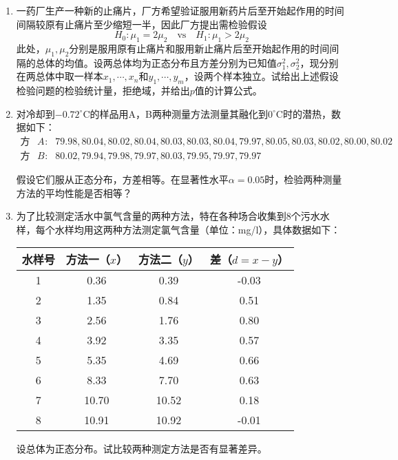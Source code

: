 \begin{enumerate}
\item 一药厂生产一种新的止痛片，厂方希望验证服用新药片后至开始起作用的时间间隔较原有止痛片至少缩短一半，因此厂方提出需检验假设
$$
H_0: \mu_1 = 2\mu_2 \quad \text{vs} \quad H_1: \mu_1 > 2\mu_2
$$
此处，$\mu_1,\mu_2$分别是服用原有止痛片和服用新止痛片后至开始起作用的时间间隔的总体的均值。设两总体均为正态分布且方差分别为已知值$\sigma_1^2,\sigma_2^2$，现分别在两总体中取一样本$x_1,\cdots,x_n$和$y_1,\cdots,y_m$，设两个样本独立。试给出上述假设检验问题的检验统计量，拒绝域，并给出$p$值的计算公式。

\item  对冷却到$-0.72^{\circ}$C的样品用A，B两种测量方法测量其融化到$0^{\circ}$C时的潜热，数据如下：
\begin{eqnarray*}
    \text{方法} A&:& 79.98, 80.04, 80.02, 80.04, 80.03, 80.03,  80.04, 79.97, 80.05, 80.03, 80.02, 80.00, 80.02\\
    \text{方法} B&:& 80.02, 79.94, 79.98, 79.97, 80.03,79.95, 79.97, 79.97
\end{eqnarray*}

假设它们服从正态分布，方差相等。在显著性水平$\alpha = 0.05$时，检验两种测量方法的平均性能是否相等？

\item 为了比较测定活水中氯气含量的两种方法，特在各种场合收集到8个污水水样，每个水样均用这两种方法测定氯气含量（单位：mg/l），具体数据如下：

\begin{table}[ht]
\centering
\begin{tabular}{cccc}
\hline
水样号 & 方法一（$x$） & 方法二（$y$）& 差（$d = x-y$） \\
\hline
 1 & 0.36 & 0.39 & -0.03\\
 2 & 1.35 & 0.84 &  0.51 \\
 3 & 2.56 & 1.76 & 0.80 \\ 
 4 & 3.92 & 3.35 & 0.57 \\ 
 5 & 5.35 & 4.69 & 0.66  \\
 6 & 8.33 & 7.70 & 0.63  \\
 7 & 10.70 & 10.52 & 0.18 \\
 8 & 10.91 & 10.92 & -0.01 \\
\hline
\end{tabular}
\end{table}

设总体为正态分布。试比较两种测定方法是否有显著差异。
\end{enumerate}


